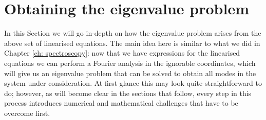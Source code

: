 \section{Obtaining the eigenvalue problem} \label{sec: eigenvalue problem}
In this Section we will go in-depth on how the eigenvalue problem arises from the above set of linearised equations.
The main idea here is similar to what we did in Chapter \ref{ch: spectroscopy}: now that we have expressions for the linearised equations we can perform a Fourier analysis in the ignorable coordinates, which will give us an eigenvalue problem that can be solved to obtain all modes in the system under consideration. At first glance this may look quite straightforward to do; however, as will become clear in the sections that follow, every step in this process introduces numerical and mathematical challenges that have to be overcome first.

